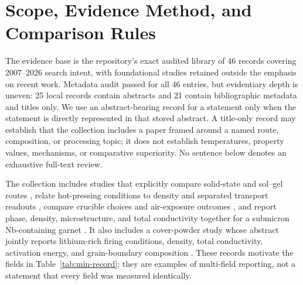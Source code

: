 \section{Scope, Evidence Method, and Comparison Rules}

The evidence base is the repository's exact audited library of 46 records covering 2007--2026 search intent, with foundational studies retained outside the emphasis on recent work. Metadata audit passed for all 46 entries, but evidentiary depth is uneven: 25 local records contain abstracts and 21 contain bibliographic metadata and titles only. We use an abstract-bearing record for a statement only when the statement is directly represented in that stored abstract. A title-only record may establish that the collection includes a paper framed around a named route, composition, or processing topic; it does not establish temperatures, property values, mechanisms, or comparative superiority. No sentence below denotes an exhaustive full-text review.

The collection includes studies that explicitly compare solid-state and sol--gel routes \cite{kosir2022comparative}, relate hot-pressing conditions to density and separated transport readouts \cite{david2015microstructure}, compare crucible choices and air-exposure outcomes \cite{xia2016ionic}, and report phase, density, microstructure, and total conductivity together for a submicron Nb-containing garnet \cite{yan2020submicron}. It also includes a cover-powder study whose abstract jointly reports lithium-rich firing conditions, density, total conductivity, activation energy, and grain-boundary composition \cite{zhang2019densification}. These records motivate the fields in Table~\ref{tab:min-record}; they are examples of multi-field reporting, not a statement that every field was measured identically.

